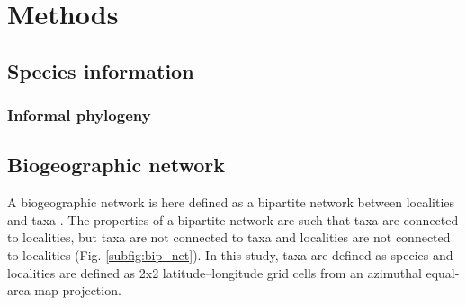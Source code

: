 \documentclass[12pt,letterpaper]{article}
\begin{document}
\section{Methods}
\subsection{Species information}

\subsubsection{Informal phylogeny}

\subsection{Biogeographic network}

A biogeographic network is here defined as a bipartite network between localities and taxa \citep{Vilhena2013b,Vilhena2013,Sidor2013}. The properties of a bipartite network are such that taxa are connected to localities, but taxa are not connected to taxa and localities are not connected to localities (Fig. \ref{subfig:bip_net}). In this study, taxa are defined as species and localities are defined as 2x2 latitude--longitude grid cells from an azimuthal equal-area map projection.
\end{document}
